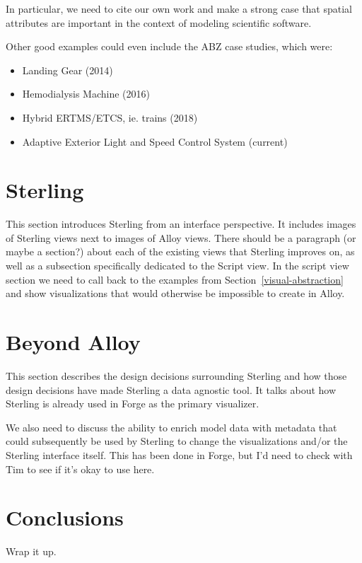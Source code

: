 \documentclass[runningheads]{llncs}
\begin{document}
In particular, we need to cite our own work and make a strong case that spatial attributes are important in the context of modeling scientific software.

Other good examples could even include the ABZ case studies, which were:
\begin{itemize}
    \item Landing Gear (2014)
    \item Hemodialysis Machine (2016)
    \item Hybrid ERTMS/ETCS, ie. trains (2018)
    \item Adaptive Exterior Light and Speed Control System (current)
\end{itemize}

\section{Sterling}
\label{sterling}

This section introduces Sterling from an interface perspective. It includes images of Sterling views next to images of Alloy views. There should be a paragraph (or maybe a section?) about each of the existing views that Sterling improves on, as well as a subsection specifically dedicated to the Script view. In the script view section we need to call back to the examples from Section~\ref{visual-abstraction} and show visualizations that would otherwise be impossible to create in Alloy.

\section{Beyond Alloy}
\label{other-tools}

This section describes the design decisions surrounding Sterling and how those design decisions have made Sterling a data agnostic tool. It talks about how Sterling is already used in Forge as the primary visualizer.

We also need to discuss the ability to enrich model data with metadata that could subsequently be used by Sterling to change the visualizations and/or the Sterling interface itself. This has been done in Forge, but I'd need to check with Tim to see if it's okay to use here.

\section{Conclusions}
\label{conclusions}

Wrap it up.
\end{document}

